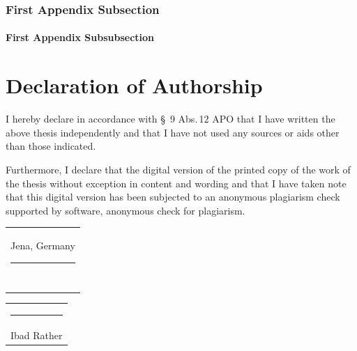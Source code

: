 \documentclass[
thesis%
]{csthes}
\begin{document}
\subsection{First Appendix Subsection}
\subsubsection{First Appendix Subsubsection}

\cleardoublepage



\chapter*{Declaration of Authorship}

I hereby declare in accordance with \S~9 Abs.\,12 APO that I have written the above {\thesistype}thesis independently and that I have not used any sources or aids other than those indicated. 

Furthermore, I declare that the digital version of the printed copy of the {\thesistype}work 
of the {\thesistype} thesis without exception in content and wording and that I have taken note 
that this digital version has been subjected to an anonymous plagiarism check supported by software, 
anonymous check for plagiarism. 


\bigskip
\bigskip

\begin{tabular}{@{}l@{}}
  Jena, Germany \rule[-0.8em]{7em}{0.5pt}\\[2ex]
  ~
\end{tabular}
\hspace{\fill}%
\begin{tabular}{@{}c@{}}
  \rule[-0.8em]{19em}{0.5pt}\\[2ex]
  {Ibad Rather}
\end{tabular}\hspace{\fill}

\end{document}
